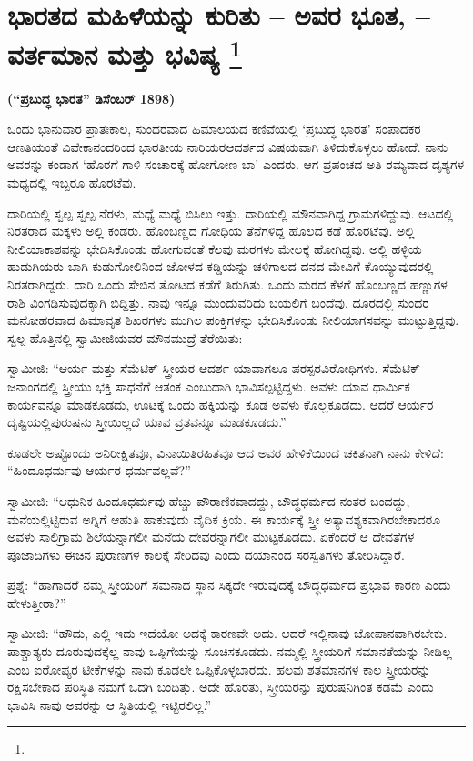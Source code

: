 
\chapter[ಭಾರತದ ಮಹಿಳೆಯನ್ನು ಕುರಿತು – ಅವರ ಭೂತ, – ವರ್ತಮಾನ ಮತ್ತು ಭವಿಷ್ಯ ]{ಭಾರತದ ಮಹಿಳೆಯನ್ನು ಕುರಿತು – ಅವರ ಭೂತ, – ವರ್ತಮಾನ ಮತ್ತು ಭವಿಷ್ಯ \protect\footnote{}}

\centerline{\textbf{(“ಪ್ರಬುದ್ಧ ಭಾರತ” ಡಿಸೆಂಬರ್​ 1898)}}

ಒಂದು ಭಾನುವಾರ ಪ್ರಾತಃಕಾಲ, ಸುಂದರವಾದ ಹಿಮಾಲಯದ ಕಣಿವೆಯಲ್ಲಿ ‘ಪ್ರಬುದ್ಧ ಭಾರತ’ ಸಂಪಾದಕರ ಆಣತಿಯಂತೆ ವಿವೇಕಾನಂದರಿಂದ ಭಾರತೀಯ ನಾರಿಯರ\break ಆದರ್ಶದ ವಿಷಯವಾಗಿ ತಿಳಿದುಕೊಳ್ಳಲು ಹೋದೆ. ನಾನು ಅವರನ್ನು ಕಂಡಾಗ ‘ಹೊರಗೆ ಗಾಳಿ ಸಂಚಾರಕ್ಕೆ ಹೋಗೋಣ ಬಾ’ ಎಂದರು. ಆಗ ಪ್ರಪಂಚದ ಅತಿ ರಮ್ಯವಾದ ದೃಶ್ಯಗಳ ಮಧ್ಯದಲ್ಲಿ ಇಬ್ಬರೂ ಹೊರಟೆವು.

ದಾರಿಯಲ್ಲಿ ಸ್ವಲ್ಪ ಸ್ವಲ್ಪ ನೆರಳು, ಮಧ್ಯೆ ಮಧ್ಯೆ ಬಿಸಿಲು ಇತ್ತು. ದಾರಿಯಲ್ಲಿ ಮೌನವಾಗಿದ್ದ ಗ್ರಾಮಗಳಿದ್ದುವು. ಆಟದಲ್ಲಿ ನಿರತರಾದ ಮಕ್ಕಳು ಅಲ್ಲಿ ಕಂಡರು. ಹೊಂಬಣ್ಣದ ಗೋಧಿಯ ತೆನೆಗಳಿದ್ದ ಹೊಲದ ಕಡೆ ಹೊರಟೆವು. ಅಲ್ಲಿ ನೀಲಿಯಾಕಾಶವನ್ನು ಭೇದಿಸಿಕೊಂಡು ಹೋಗುವಂತೆ ಕೆಲವು ಮರಗಳು ಮೇಲಕ್ಕೆ ಹೋಗಿದ್ದವು. ಅಲ್ಲಿ ಹಳ್ಳಿಯ ಹುಡುಗಿಯರು ಬಾಗಿ ಕುಡುಗೋಲಿನಿಂದ ಜೋಳದ ಕಡ್ಡಿಯನ್ನು ಚಳಿಗಾಲದ ದನದ ಮೇವಿಗೆ ಕೊಯ್ಯುವುದರಲ್ಲಿ ನಿರತರಾಗಿದ್ದರು. ದಾರಿ ಒಂದು ಸೇಬಿನ ತೋಟದ ಕಡೆಗೆ ತಿರುಗಿತು. ಒಂದು ಮರದ ಕೆಳಗೆ ಹೊಂಬಣ್ಣದ ಹಣ್ಣುಗಳ ರಾಶಿ ವಿಂಗಡಿಸುವುದಕ್ಕಾಗಿ ಬಿದ್ದಿತ್ತು. ನಾವು ಇನ್ನೂ ಮುಂದುವರಿದು ಬಯಲಿಗೆ ಬಂದೆವು. ದೂರದಲ್ಲಿ ಸುಂದರ ಮನೋಹರವಾದ ಹಿಮಾವೃತ ಶಿಖರಗಳು ಮುಗಿಲ ಪಂಕ್ತಿಗಳನ್ನು ಭೇದಿಸಿಕೊಂಡು ನೀಲಿಯಾಗಸವನ್ನು ಮುಟ್ಟುತ್ತಿದ್ದವು. ಸ್ವಲ್ಪ ಹೊತ್ತಿನಲ್ಲಿ ಸ್ವಾಮೀಜಿಯವರ ಮೌನಮುದ್ರೆ ತೆರೆಯಿತು:

ಸ್ವಾಮೀಜಿ: “ಆರ್ಯ ಮತ್ತು ಸೆಮೆಟಿಕ್​ ಸ್ತ್ರೀಯರ ಆದರ್ಶ ಯಾವಾಗಲೂ ಪರಸ್ಪರ\break ವಿರೋಧಿಗಳು. ಸೆಮೆಟಿಕ್​ ಜನಾಂಗದಲ್ಲಿ ಸ್ತ್ರೀಯು ಭಕ್ತಿ ಸಾಧನೆಗೆ ಆತಂಕ ಎಂಬುದಾಗಿ ಭಾವಿಸಲ್ಪಟ್ಟಿದ್ದಳು. ಅವಳು ಯಾವ ಧಾರ್ಮಿಕ ಕಾರ್ಯವನ್ನೂ ಮಾಡಕೂಡದು, ಊಟಕ್ಕೆ ಒಂದು ಹಕ್ಕಿಯನ್ನು ಕೂಡ ಅವಳು ಕೊಲ್ಲಕೂಡದು. ಆದರೆ ಆರ್ಯರ ದೃಷ್ಟಿಯಲ್ಲಿ\break ಪುರುಷನು ಸ್ತ್ರೀಯಿಲ್ಲದೆ ಯಾವ ವ್ರತವನ್ನೂ ಮಾಡಕೂಡದು.”

ಕೂಡಲೇ ಅಷ್ಟೊಂದು ಅನಿರೀಕ್ಷಿತವೂ, ವಿನಾಯಿತಿರಹಿತವೂ ಆದ ಅವರ ಹೇಳಿಕೆಯಿಂದ ಚಕಿತನಾಗಿ ನಾನು ಕೇಳಿದೆ: “ಹಿಂದೂಧರ್ಮವು ಆರ್ಯರ ಧರ್ಮವಲ್ಲವೆ?”

ಸ್ವಾಮೀಜಿ: “ಆಧುನಿಕ ಹಿಂದೂಧರ್ಮವು ಹೆಚ್ಚು ಪೌರಾಣಿಕವಾದದ್ದು, ಬೌದ್ಧಧರ್ಮದ ನಂತರ ಬಂದದ್ದು, ಮನೆಯಲ್ಲಿಟ್ಟಿರುವ ಅಗ್ನಿಗೆ ಆಹುತಿ ಹಾಕುವುದು ವೈದಿಕ ಕ್ರಿಯೆ. ಈ ಕಾರ್ಯಕ್ಕೆ ಸ್ತ್ರೀ ಅತ್ಯಾವಶ್ಯಕವಾಗಿರಬೇಕಾದರೂ ಅವಳು ಸಾಲಿಗ್ರಾಮ ಶಿಲೆಯನ್ನಾಗಲೀ ಮನೆಯ ದೇವರನ್ನಾಗಲೀ ಮುಟ್ಟಕೂಡದು. ಏಕೆಂದರೆ ಆ ದೇವತೆಗಳ ಪೂಜಾದಿಗಳು ಈಚಿನ ಪುರಾಣಗಳ ಕಾಲಕ್ಕೆ ಸೇರಿದವು ಎಂದು ದಯಾನಂದ ಸರಸ್ವತಿಗಳು ತೋರಿಸಿದ್ದಾರೆ.

ಪ್ರಶ್ನೆ: “ಹಾಗಾದರೆ ನಮ್ಮ ಸ್ತ್ರೀಯರಿಗೆ ಸಮನಾದ ಸ್ಥಾನ ಸಿಕ್ಕದೇ ಇರುವುದಕ್ಕೆ ಬೌದ್ಧಧರ್ಮದ ಪ್ರಭಾವ ಕಾರಣ ಎಂದು ಹೇಳುತ್ತೀರಾ?”

ಸ್ವಾಮೀಜಿ: “ಹೌದು, ಎಲ್ಲಿ ಇದು ಇದೆಯೋ ಅದಕ್ಕೆ ಕಾರಣವೇ ಅದು. ಆದರೆ ಇಲ್ಲಿ\break ನಾವು ಜೋಪಾನವಾಗಿರಬೇಕು. ಪಾಶ್ಚಾತ್ಯರು ದೂರುವುದಕ್ಕೆಲ್ಲ ನಾವು ಒಪ್ಪಿಗೆಯನ್ನು ಸೂಚಿಸಕೂಡದು. ನಮ್ಮಲ್ಲಿ ಸ್ತ್ರೀಯರಿಗೆ ಸಮಾನತೆಯನ್ನು ನೀಡಿಲ್ಲ ಎಂಬ ಐರೋಪ್ಯರ ಟೀಕೆಗಳನ್ನು ನಾವು ಕೂಡಲೇ ಒಪ್ಪಿಕೊಳ್ಳಬಾರದು. ಹಲವು ಶತಮಾನಗಳ ಕಾಲ ಸ್ತ್ರೀಯರನ್ನು ರಕ್ಷಿಸಬೇಕಾದ ಪರಿಸ್ಥಿತಿ ನಮಗೆ ಒದಗಿ ಬಂದಿತ್ತು. ಅದೇ ಹೊರತು, ಸ್ತ್ರೀಯರನ್ನು ಪುರುಷನಿಗಿಂತ ಕಡಮೆ ಎಂದು ಭಾವಿಸಿ ನಾವು ಅವರನ್ನು ಆ ಸ್ಥಿತಿಯಲ್ಲಿ ಇಟ್ಟಿರಲಿಲ್ಲ.”

